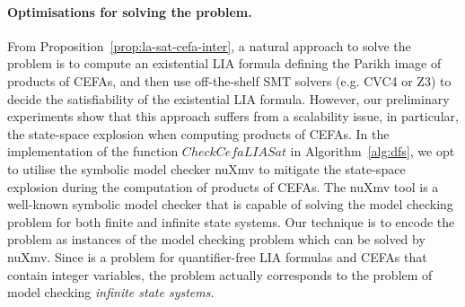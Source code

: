 \paragraph*{Optimisations for solving the {\lasat} problem.} From Proposition~\ref{prop:la-sat-cefa-inter}, a natural approach to solve the {\lasat} problem is to compute an existential LIA formula defining the Parikh image of products of CEFAs, and then use off-the-shelf SMT solvers (e.g. CVC4 or Z3) to decide the satisfiability of the existential LIA formula. %
However, our preliminary experiments show that this approach suffers from a scalability issue, in particular, %
the state-space explosion when computing products of CEFAs.  %
In the implementation of the function $\mathit{CheckCefaLIASat}$ in Algorithm~\ref{alg:dfs},  we %
opt to utilise the symbolic model checker nuXmv \cite{nuxmv} to mitigate the state-space explosion during the computation of products of CEFAs. The nuXmv tool is a well-known symbolic model checker that is capable of solving the model checking problem for both finite and infinite state systems. Our technique is to encode the {\lasat} problem as instances of the model checking problem which can  be solved by %
nuXmv. Since  {\lasat} is a problem for quantifier-free LIA formulas and CEFAs that contain integer variables, the {\lasat} problem actually corresponds to the problem of model checking \emph{infinite state systems}. 
%
%



%
%
%


%
%
%
%
%
%
%
%
%
%



